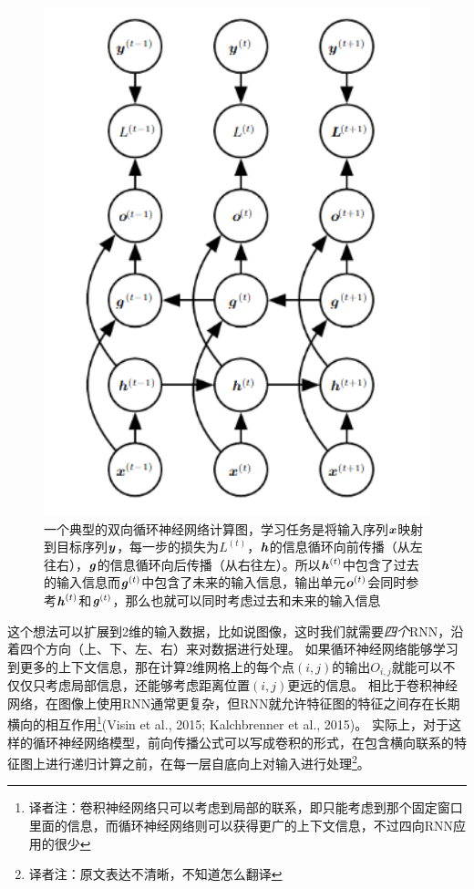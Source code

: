 \begin{figure}[htbp] %
   \centering
   \includegraphics[width=6in]{fig/chap10/10_11.PNG} 
   \caption{一个典型的双向循环神经网络计算图，学习任务是将输入序列$\boldsymbol{\mathit{x}}$映射到目标序列$\boldsymbol{\mathit{y}}$，每一步的损失为$L^{(t)}$，$\boldsymbol{\mathit{h}}$的信息循环向前传播（从左往右），$\boldsymbol{\mathit{g}}$的信息循环向后传播（从右往左）。所以$\boldsymbol{\mathit{h}}^{(t)}$中包含了过去的输入信息而$\boldsymbol{\mathit{g}}^{(t)}$中包含了未来的输入信息，输出单元$\boldsymbol{\mathit{o}}^{(t)}$会同时参考$\boldsymbol{\mathit{h}}^{(t)}$和$\boldsymbol{\mathit{g}}^{(t)}$，那么也就可以同时考虑过去和未来的输入信息}
   \label{fig:10_11}
\end{figure}

这个想法可以扩展到2维的输入数据，比如说图像，这时我们就需要\emph{四个}RNN，沿着四个方向（上、下、左、右）来对数据进行处理。
如果循环神经网络能够学习到更多的上下文信息，那在计算2维网格上的每个点$(i, j)$的输出$O_{i,j}$就能可以不仅仅只考虑局部信息，还能够考虑距离位置$(i, j)$更远的信息。
相比于卷积神经网络，在图像上使用RNN通常更复杂，但RNN就允许特征图的特征之间存在长期横向的相互作用\footnote{译者注：卷积神经网络只可以考虑到局部的联系，即只能考虑到那个固定窗口里面的信息，而循环神经网络则可以获得更广的上下文信息，不过四向RNN应用的很少}(Visin et al., 2015; Kalchbrenner et al., 2015)。
实际上，对于这样的循环神经网络模型，前向传播公式可以写成卷积的形式，在包含横向联系的特征图上进行递归计算之前，在每一层自底向上对输入进行处理\footnote{译者注：原文表达不清晰，不知道怎么翻译}。
